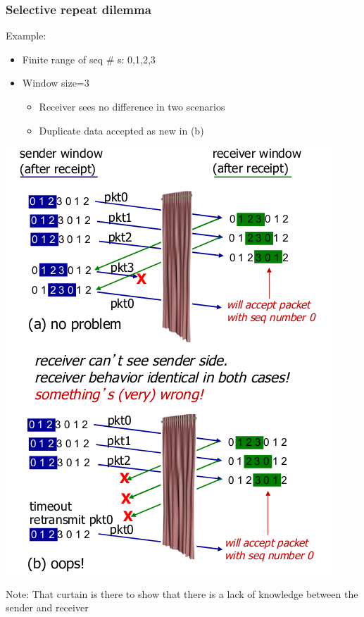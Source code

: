 \documentclass{article}[18pt]
\begin{document}
\subsubsection{Selective repeat dilemma}
Example:
\begin{itemize}
	\item Finite range of seq \# s: 0,1,2,3
	\item Window size=3
	\begin{itemize}
		\item Receiver sees no difference in two scenarios
		\item Duplicate data accepted as new in (b)
	\end{itemize}
\end{itemize}
\begin{center}
	\includegraphics[scale=0.6]{selective_repeat_dilemma}
\end{center}
Note: That curtain is there to show that there is a lack of knowledge between the sender and receiver 
\end{document}
